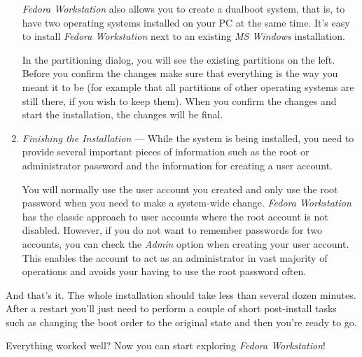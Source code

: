\begin{enumerate}
\emph{Fedora Workstation} also allows you to create a dualboot system, that is, to have two operating systems installed on your PC at the same time. It's easy to install \emph{Fedora Workstation} next to an existing \emph{MS Windows} installation.

In the partitioning dialog, you will see the existing partitions on the left. Before you confirm the changes make sure that everything is the way you meant it to be (for example that all partitions of other operating systems are still there, if you wish to keep them). When you confirm the changes and start the installation, the changes will be final.

\item\emph{Finishing the Installation} --- While the system is being installed, you need to provide several important pieces of information such as the root or administrator password and the information for creating a user account.

You will normally use the user account you created and only use the root password when you need to make a system-wide change. \emph{Fedora Workstation} has the classic approach to user accounts where the root account is not disabled. However, if you do not want to remember passwords for two accounts, you can check the \emph{Admin} option when creating your user account. This enables the account to act as an administrator in vast majority of operations and avoids your having to use the root password often.
\end{enumerate}

And that's it. The whole installation should take less than several dozen minutes. After a restart you'll just need to perform a couple of short post-install tasks such as changing the boot order to the original state and then you're ready to go.

Everything worked well? Now you can start exploring \emph{Fedora Workstation}!

\endinput
